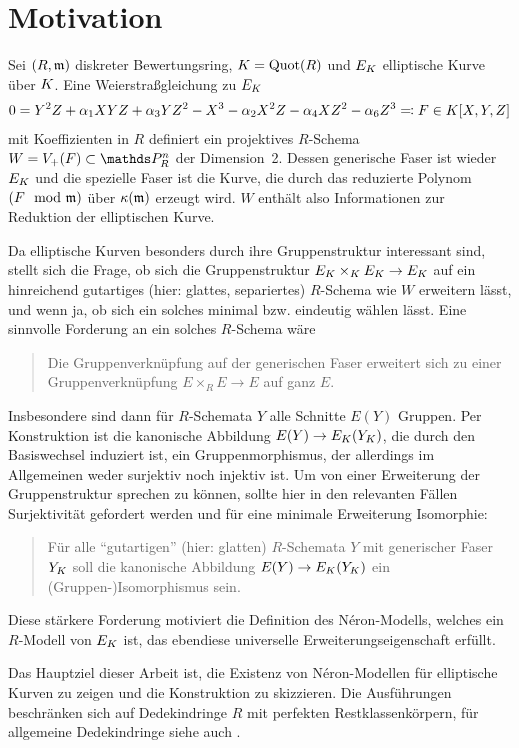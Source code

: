 \chapter{Motivation}

Sei $(R,\mathfrak{m})$ diskreter Bewertungsring, $K=\operatorname{Quot}(R)$ und $E_{K}$
elliptische Kurve über $K$. Eine Weierstraßgleichung zu $E_{K}$
\begin{gather*}
  0 = Y^2 Z + \alpha_1 XYZ + \alpha_3 YZ^2 - X^3 - \alpha_2X^2 Z - \alpha_4 XZ^2 - \alpha_6 Z^3
  \eqqcolon F\in K[X,Y,Z]  
\end{gather*}
mit Koeffizienten in $R$ definiert ein projektives $R$-Schema
$W=V_+(F)\subset\P_R^n$ der Dimension~2. Dessen generische Faser
ist wieder $E_{K}$ und die spezielle Faser ist die Kurve, die durch das
reduzierte Polynom $(F\mod{\mathfrak{m}})$ über $\kappa(\mathfrak{m})$ erzeugt wird.
$W$ enthält also Informationen zur Reduktion der elliptischen
Kurve.

Da elliptische Kurven besonders durch ihre Gruppenstruktur
interessant sind, stellt sich die Frage, ob sich die
Gruppenstruktur $E_{K}\times_{K} E_{K}\to E_{K}$ auf ein hinreichend
gutartiges (hier: glattes, separiertes) $R$-Schema wie $W$ erweitern
lässt, und wenn ja, ob sich ein solches minimal bzw. eindeutig wählen
lässt.
Eine sinnvolle Forderung an ein solches $R$-Schema wäre
\begin{quote}
  Die Gruppenverknüpfung auf der generischen Faser erweitert sich zu
  einer Gruppenverknüpfung $E\times_R E\to E$ auf ganz $E$.
\end{quote}
Insbesondere sind dann für $R$-Schemata $Y$ alle Schnitte $E(Y)$
Gruppen. Per Konstruktion ist die kanonische Abbildung
$E(Y)\to E_{K}(Y_{K})$, die durch den Basiswechsel induziert ist, ein
Gruppenmorphismus, der allerdings im Allgemeinen weder surjektiv noch
injektiv ist. Um von einer Erweiterung der Gruppenstruktur sprechen zu
können, sollte hier in den relevanten Fällen Surjektivität
gefordert werden und für eine minimale Erweiterung Isomorphie:
\begin{quote}
  Für alle \enquote{gutartigen} (hier: glatten) $R$-Schemata $Y$ mit
  generischer Faser $Y_{K}$ soll die kanonische Abbildung
  $E(Y)\to E_{K}(Y_{K})$ ein (Gruppen-)Isomorphismus sein.
\end{quote}
Diese stärkere Forderung motiviert die Definition des
Néron-Modells, welches ein $R$-Modell von $E_{K}$ ist, das ebendiese
universelle Erweiterungseigenschaft erfüllt.

Das Hauptziel dieser Arbeit ist, die Existenz von Néron-Modellen
für elliptische Kurven zu zeigen und die Konstruktion zu skizzieren.
Die Ausführungen beschränken sich auf Dedekindringe $R$ mit perfekten
Restklassenkörpern, für allgemeine Dedekindringe siehe auch
\cite{nonperfect}.

